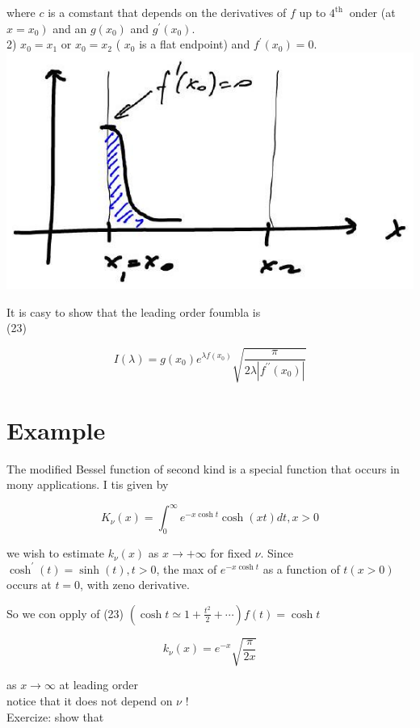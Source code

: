 \documentclass[10pt]{article}
\begin{document}
where $c$ is a comstant that depends on the derivatives of $f$ up to $4^{\text {th }}$ onder (at $\left.x=x_{0}\right)$ and an $g\left(x_{0}\right)$ and $g^{\prime}\left(x_{0}\right)$.\\
2) $x_{0}=x_{1}$ or $x_{0}=x_{2}$ ( $x_{0}$ is a flat endpoint) and $f^{\prime}\left(x_{0}\right)=0$.\\
\includegraphics[max width=\textwidth, center]{2025_10_19_6d9f59a2c3b97d481c52g-3}

It is casy to show that the leading order foumbla is\\
(23)

$$
I(\lambda)=g\left(x_{0}\right) e^{\lambda f\left(x_{0}\right)} \sqrt{\frac{\pi}{2 \lambda\left|f^{\prime \prime}\left(x_{0}\right)\right|}}
$$

\section*{Example}
The modified Bessel function of second kind is a special function that occurs in mony applications. I tis given by

$$
K_{\nu}(x)=\int_{0}^{\infty} e^{-x \cosh t} \cosh (x t) d t, x>0
$$

we wish to estimate $k_{\nu}(x)$ as $x \rightarrow+\infty$ for fixed $\nu$. Since $\cosh ^{\prime}(t)=\sinh (t), t>0$, the max of $e^{-x \cosh t}$ as a function of $t(x>0)$ occurs at $t=0$, with zeno derivative.

So we con opply of (23) $\left(\cosh t \simeq 1+\frac{t^{2}}{2}+\cdots\right) f(t)=\cosh t$

$$
k_{\nu}(x)=e^{-x} \sqrt{\frac{\pi}{2 x}}
$$

as $x \rightarrow \infty$ at leading order\\
notice that it does not depend on $\nu$ !\\
Exercize: show that
\end{document}
